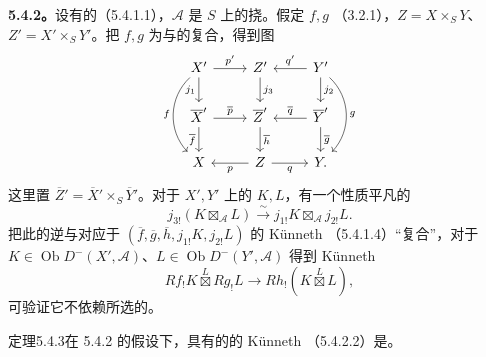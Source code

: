 \textbf{5.4.2。}设有的（5.4.1.1），$\mathscr A$ 是 $S$ 上的挠。假定 $f,g$ （3.2.1），$Z=X\times_S Y$、$Z'=X'\times_S Y'$。把 $f,g$ 为与的复合，得到图
\[\begin{tikzcd}
X'\arrow[d,"j_1"']\arrow[dd,bend right=45,"f"']\arrow[r,"p'"]&Z'\arrow[d,"j_3"]&Y'\arrow[l,"q'"']\arrow[d,"j_2"]\arrow[dd,bend left=45,"g"]\\
\overline X'\arrow[d,"\overline f"']\arrow[r,"\overline p"]&\overline Z'\arrow[d,"\overline h"]&\overline Y'\arrow[l,"\overline q"']\arrow[d,"\overline g"]\\
X&Z\arrow[l,"p"]\arrow[r,"q"']&Y .
\end{tikzcd}\]
这里置 $\overline Z'=\overline X'\times_S\overline Y'$。对于 $X',Y'$ 上的 $K,L$，有一个性质平凡的
\begin{equation}\tag{5.4.2.1}j_{3!}(K\boxtimes_{\mathscr A}L)\xrightarrow\sim j_{1!}K\boxtimes_{\mathscr A}j_{2!}L.\end{equation}
把此的逆与对应于 $(\overline f,\overline g,\overline h,j_{1!}K,j_{2!}L)$ 的 Künneth （5.4.1.4）“复合”，对于 $K\in\operatorname{Ob}D^-(X',\mathscr A)$、$L\in\operatorname{Ob}D^-(Y',\mathscr A)$ 得到 Künneth 
\begin{equation}\tag{5.4.2.2}Rf_!K\overset L\boxtimes Rg_!L\longrightarrow Rh_!(K\overset L\boxtimes L),\end{equation}
可验证它不依赖所选的。
\begin{SGAresult}{定理}{5.4.3}在 5.4.2 的假设下，具有的的 Künneth （5.4.2.2）是。\end{SGAresult}
